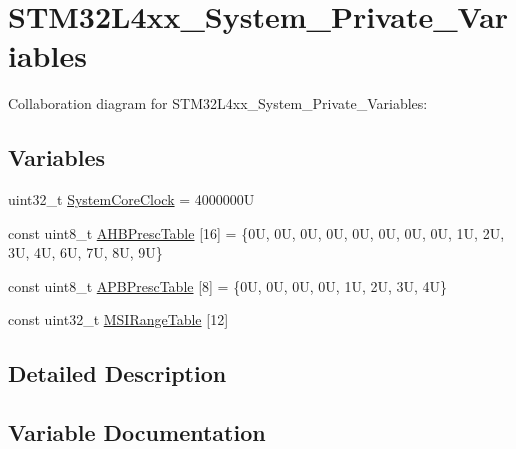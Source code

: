 \hypertarget{group__STM32L4xx__System__Private__Variables}{}\section{S\+T\+M32\+L4xx\+\_\+\+System\+\_\+\+Private\+\_\+\+Variables}
\label{group__STM32L4xx__System__Private__Variables}
Collaboration diagram for S\+T\+M32\+L4xx\+\_\+\+System\+\_\+\+Private\+\_\+\+Variables\+:
\subsection*{Variables}
\begin{DoxyCompactItemize}
\item 
uint32\+\_\+t \hyperlink{group__STM32L4xx__System__Private__Variables_gaa3cd3e43291e81e795d642b79b6088e6}{System\+Core\+Clock} = 4000000U
\item 
const uint8\+\_\+t \hyperlink{group__STM32L4xx__System__Private__Variables_ga6e1d9cd666f0eacbfde31e9932a93466}{A\+H\+B\+Presc\+Table} \mbox{[}16\mbox{]} = \{0\+U, 0\+U, 0\+U, 0\+U, 0\+U, 0\+U, 0\+U, 0\+U, 1\+U, 2\+U, 3\+U, 4\+U, 6\+U, 7\+U, 8\+U, 9\+U\}
\item 
const uint8\+\_\+t \hyperlink{group__STM32L4xx__System__Private__Variables_ga5b4f8b768465842cf854a8f993b375e9}{A\+P\+B\+Presc\+Table} \mbox{[}8\mbox{]} = \{0\+U, 0\+U, 0\+U, 0\+U, 1\+U, 2\+U, 3\+U, 4\+U\}
\item 
const uint32\+\_\+t \hyperlink{group__STM32L4xx__System__Private__Variables_ga4d9e663c3c5bd4ca3361bf97d48158bf}{M\+S\+I\+Range\+Table} \mbox{[}12\mbox{]}
\end{DoxyCompactItemize}


\subsection{Detailed Description}


\subsection{Variable Documentation}
\mbox{\label{group__STM32L4xx__System__Private__Variables_ga6e1d9cd666f0eacbfde31e9932a93466}} 
